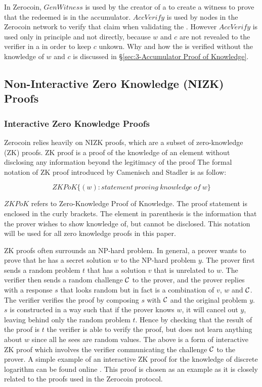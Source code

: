 In Zerocoin, $GenWitness$ is used by the creator of a  to create a witness to prove that the redeemed \kwCoin{} is in the accumulator. $AccVerify$ is used by nodes in the Zerocoin network to verify that claim when validating the . However $AccVerify$ is used only in principle and not directly, because $w$ and $c$ are not revealed to the verifier in a  in order to keep $c$ unkown. Why and how the  is verified without the knowledge of $w$ and $c$ is discussed in \S\ref{sec:3-Accumulator Proof of Knowledge}.

\subsection{Non-Interactive Zero Knowledge (NIZK) Proofs}
\label{sec:3-Non-Interactive Zero Knowledge (NIZK) Proofs}
\subsubsection{Interactive Zero Knowledge Proofs}
\label{sec:3-Interactive Zero Knowledge Proofs}
Zerocoin relies heavily on NIZK proofs, which are a subset of zero-knowledge (ZK) proofs. ZK proof is a proof of the knowledge of an element without disclosing any information beyond the legitimacy of the proof \cite{Kiayias} The formal notation of ZK proof introduced by Camenisch and Stadler \cite{Camenisch1997a} is as follow:

$$ZKPoK\{(w):statement\ proving\ knowledge\ of\ w\}$$

$ZKPoK$ refers to Zero-Knowledge Proof of Knowledge. The proof statement is enclosed in the curly brackets. The element in parenthesis is the information that the prover wishes to show knowledge of, but cannot be disclosed. This notation will be used for all zero knowledge proofs in this paper. 

ZK proofs often surrounds an NP-hard problem. In general, a prover wants to prove that he has a secret solution $w$ to the NP-hard problem $y$. The prover first sends a random problem $t$ that has a solution $v$ that is unrelated to $w$. The verifier then sends a random challenge $\mathcal{C}$ to the prover, and the prover replies with a response $s$ that looks random but in fact is a combination of $v$, $w$ and $\mathcal{C}$. The verifier verifies the proof by composing $s$ with $\mathcal{C}$ and the original problem $y$. $s$ is constructed in a way such that if the prover knows $w$, it will cancel out $y$, leaving behind only the random problem $t$. Hence by checking that the result of the proof is $t$ the verifier is able to verify the proof, but does not learn anything about $w$ since all he sees are random values. The above is a form of interactive ZK proof which involves the verifier communicating the challenge $\mathcal{C}$ to the prover. A simple example of an interactive ZK proof for the knowledge of discrete logarithm can be found online \cite{Unknown2016}. This proof is chosen as an example as it is closely related to the proofs used in the Zerocoin protocol.

